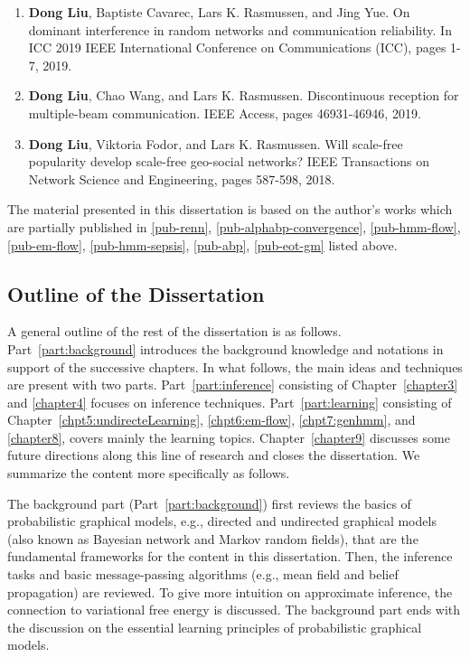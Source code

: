 \begin{enumerate}
\item \textbf{Dong Liu}, Baptiste Cavarec, Lars K. Rasmussen, and Jing Yue. On dominant interference in random networks and communication reliability. In ICC 2019 IEEE International Conference on Communications (ICC), pages 1-7, 2019.
  
\item \textbf{Dong Liu}, Chao Wang, and Lars K. Rasmussen. Discontinuous reception for multiple-beam communication. IEEE Access, pages 46931-46946, 2019.
  
\item \textbf{Dong Liu}, Viktoria Fodor, and Lars K. Rasmussen. Will scale-free popularity develop scale-free geo-social networks? IEEE Transactions on Network Science and Engineering, pages 587-598, 2018.
\end{enumerate}


The material presented in this dissertation is based on the author's works which are partially published in \ref{pub-renn}, \ref{pub-alphabp-convergence}, \ref{pub-hmm-flow}, \ref{pub-em-flow}, \ref{pub-hmm-sepsis}, \ref{pub-abp}, \ref{pub-eot-gm} listed above.
\subsection{Outline of the Dissertation}

A general outline of the rest of the dissertation is as follows. Part~\ref{part:background} introduces the background knowledge and notations in support of the successive chapters. In what follows, the main ideas and techniques are present with two parts. Part~\ref{part:inference} consisting of Chapter~\ref{chapter3} and \ref{chapter4} focuses on inference techniques. Part~\ref{part:learning} consisting of Chapter~\ref{chpt5:undirecteLearning}, \ref{chpt6:em-flow}, \ref{chpt7:genhmm}, and \ref{chapter8}, covers mainly the learning topics. Chapter~\ref{chapter9} discusses some future directions along this line of research and closes the dissertation. We summarize the content more specifically as follows.

The background part (Part~\ref{part:background}) first reviews the basics of probabilistic graphical models, e.g., directed and undirected graphical models (also known as Bayesian network and Markov random fields), that are the fundamental frameworks for the content in this dissertation. Then, the inference tasks and basic message-passing algorithms (e.g., mean field and belief propagation) are reviewed. To give more intuition on approximate inference, the connection to variational free energy is discussed. The background part ends with the discussion on the essential learning principles of probabilistic graphical models.

